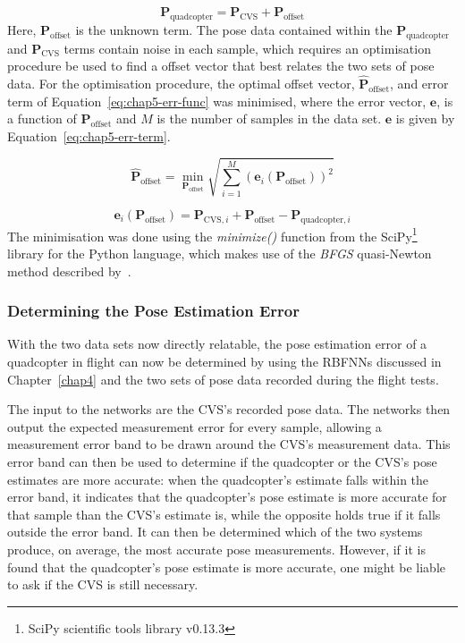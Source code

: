 \begin{equation}
  \label{eq:chap5-pose-offset}
  \bm{P}_{\mathrm{quadcopter}} = \bm{P}_{\mathrm{CVS}} + \bm{P}_{\mathrm{offset}}
\end{equation}
Here, $\bm{P}_{\mathrm{offset}}$ is the unknown term. The pose data contained within the $\bm{P}_{\mathrm{quadcopter}}$ and $\bm{P}_{\mathrm{CVS}}$ terms contain noise in each sample, which requires an optimisation procedure be used to find a offset vector that best relates the two sets of pose data. For the optimisation procedure, the optimal offset vector, $\hat{\bm{P}}_{\mathrm{offset}}$, and error term of Equation~\ref{eq:chap5-err-func} was minimised, where the error vector, $\bm{e}$, is a function of $\bm{P}_{\mathrm{offset}}$ and $M$ is the number of samples in the data set. $\bm{e}$ is given by Equation~\ref{eq:chap5-err-term}. 

\begin{equation}
  \label{eq:chap5-err-func}
  \hat{\bm{P}}_{\mathrm{offset}} = \min_{\bm{P}_{\mathrm{offset}}}\sqrt{\displaystyle\sum_{i=1}^{M} (\bm{e}_i(\bm{P}_{\mathrm{offset}}))^2}
\end{equation}

\begin{equation}
  \label{eq:chap5-err-term}
  \bm{e}_i(\bm{P}_{\mathrm{offset}}) = \bm{P}_{\mathrm{CVS}, i} + \bm{P}_{\mathrm{offset}} - \bm{P}_{\mathrm{quadcopter}, i}
\end{equation}
The minimisation was done using the \emph{minimize()} function from the SciPy\footnote{SciPy scientific tools library v0.13.3} library for the Python language, which makes use of the \emph{BFGS} quasi-Newton method described by~\cite{nocedal2006numerical}. 

\subsubsection{Determining the Pose Estimation Error}

With the two data sets now directly relatable, the pose estimation error of a quadcopter in flight can now be determined by using the RBFNNs discussed in Chapter~\ref{chap4} and the two sets of pose data recorded during the flight tests.  

The input to the networks are the CVS's recorded pose data. The networks then output the expected measurement error for every sample, allowing a measurement error band to be drawn around the CVS's measurement data. This error band can then be used to determine if the quadcopter or the CVS's pose estimates are more accurate: when the quadcopter's estimate falls within the error band, it indicates that the quadcopter's pose estimate is more accurate for that sample than the CVS's estimate is, while the opposite holds true if it falls outside the error band. It can then be determined which of the two systems produce, on average, the most accurate pose measurements. However, if it is found that the quadcopter's pose estimate is more accurate, one might be liable to ask if the CVS is still necessary.

